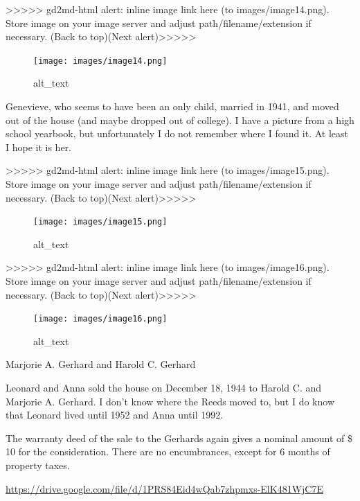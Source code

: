 \documentclass[
  12pt,
]{book}
\begin{document}
{\textgreater\textgreater\textgreater\textgreater\textgreater{} gd2md-html alert: inline image link here (to images/image14.png). Store image on your image server and adjust path/filename/extension if necessary. }(Back to top)(Next alert){\textgreater\textgreater\textgreater\textgreater\textgreater{} }

\begin{figure}
\centering
\texttt{[image: images/image14.png]}
\caption{alt\_text}
\end{figure}

Genevieve, who seems to have been an only child, married in 1941, and moved out of the house (and maybe dropped out of college). I have a picture from a high school yearbook, but unfortunately I do not remember where I found it. At least I hope it is her.

{\textgreater\textgreater\textgreater\textgreater\textgreater{} gd2md-html alert: inline image link here (to images/image15.png). Store image on your image server and adjust path/filename/extension if necessary. }(Back to top)(Next alert){\textgreater\textgreater\textgreater\textgreater\textgreater{} }

\begin{figure}
\centering
\texttt{[image: images/image15.png]}
\caption{alt\_text}
\end{figure}

{\textgreater\textgreater\textgreater\textgreater\textgreater{} gd2md-html alert: inline image link here (to images/image16.png). Store image on your image server and adjust path/filename/extension if necessary. }(Back to top)(Next alert){\textgreater\textgreater\textgreater\textgreater\textgreater{} }

\begin{figure}
\centering
\texttt{[image: images/image16.png]}
\caption{alt\_text}
\end{figure}

Marjorie A. Gerhard and Harold C. Gerhard

Leonard and Anna sold the house on December 18, 1944 to Harold C. and Marjorie A. Gerhard. I don't know where the Reeds moved to, but I do know that Leonard lived until 1952 and Anna until 1992.

The warranty deed of the sale to the Gerhards again gives a nominal amount of \$ 10 for the consideration. There are no encumbrances, except for 6 months of property taxes.

\url{https://drive.google.com/file/d/1PRS84Eid4wQab7zhpmxs-ElK481WjC7E}
\end{document}
